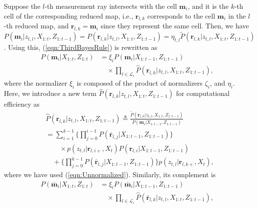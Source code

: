 \documentclass[letterpaper, 10pt, conference]{ieeeconf}
\newcommand{\refeqn}[1]{(\ref{eqn:#1})}
\begin{document}
Suppose the $l$-th measurement ray intersects with the cell $\mathbf{m}_i$, and it is the $k$-th cell of the corresponding reduced map, i.e., $\mathbf{r}_{l,k}$ corresponds to the cell $\mathbf{m}_i$ in the $l$-th reduced map, and $\mathbf{r}_{l,k}=\mathbf{m}_i$ since they represent the same cell.  Then, we have $P(\mathbf{m}_i|z_{t,l},X_{1:t},Z_{1:t-1})=P(\mathbf{r}_{l,k}|z_{t,l},X_{1:t},Z_{1:t-1})=\eta_{t,l}\tilde P(\mathbf{r}_{l,k}|z_{t,l},X_{1:t},Z_{1:t-1})$. 
%
%
Using this, \refeqn{ThirdBayesRule} is rewritten as
\begin{align}
P(\mathbf{m}_i|X_{1:t},Z_{1:t})
&=\xi_i P(\mathbf{m}_i|{X_{1:t-1}},Z_{1:t-1})\nonumber\\&\quad\times
\prod_{l\in\mathcal L_i}
\hat P(\mathbf{r}_{l,k}|z_{t,l},X_{1:t},Z_{1:t-1})
,
\label{eqn:ISM_Fusion}
\end{align}
where the normalizer $\xi_i$ is composed of the product of normalizers $\zeta_i$, and $\eta_i$. Here, we introduce a new term $\hat P(\mathbf{r}_{l,k}|z_{t,l},X_{1:t},Z_{1:t-1})$ for computational efficiency as
\begin{align}
&\hat P(\mathbf{r}_{l,k}|z_{t,l},X_{1:t},Z_{1:t-1})
\triangleq \frac{\tilde P(\mathbf{r}_{l,k}|z_{t,l},X_{1:t},Z_{1:t-1})}{P(\mathbf{m}_i|X_{1:t-1},Z_{1:t-1})}
\nonumber\\&=
\sum_{i=1}^{k-1}\bigg\{\prod_{j=0}^{i-1}P(\bar{\mathbf{r}}_{l,j}|X_{1:t-1},Z_{1:t-1})\bigg\}\nonumber\\&\quad\quad\times p(z_{t,l}|\mathbf{r}_{l,i+},X_t)P(\mathbf{r}_{l,i}|X_{1:t-1},Z_{1:t-1})
\nonumber\\&\quad
+
\bigg\{\prod_{j=0}^{k-1}P(\bar{\mathbf{r}}_{l,j}|X_{1:t-1},Z_{1:t-1})\bigg\}p(z_{t,l}|\mathbf{r}_{l,k+},X_t),
\end{align}
where we have used \refeqn{Unnormalized}. Similarly, its complement is
\begin{align}
P(\bar{\mathbf{m}}_i|{{X_{1:t}}},Z_{1:t})
&=\xi_i P(\bar{\mathbf{m}}_i|{X_{1:t-1}},Z_{1:t-1})
\nonumber\\&\quad\times\prod_{l\in\mathcal L_i}
\hat P(\bar{\mathbf{r}}_{l,k}|z_{t,l},X_{1:t},Z_{1:t-1})
,
\label{eqn:ISM_Bar_Fusion}
\end{align}
\end{document}
